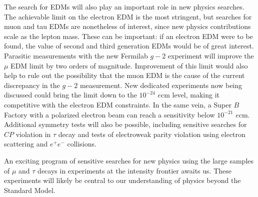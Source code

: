 The search for EDMs will also play an important role in new physics
searches. The achievable limit on the electron EDM is the most stringent, but searches for muon and tau EDMs are nonetheless of interest, since new physics contributions scale as the lepton mass. These can be
important: if an electron EDM were to be found, the value of second and third generation EDMs would be of great interest.  Parasitic measurements with the new Fermilab $g\!\!-\!\!2$ experiment will improve the $\mu$ EDM limit by two
orders of magnitude. Improvement of this limit would also help to rule out
the possibility that the muon EDM is the cause of the current discrepancy in the
$g\!\!-\!\!2$ measurement. New dedicated experiments now being discussed
could bring the limit down to the $10^{-24}$ $e$cm level, making it
competitive with the electron EDM constraints. In the same vein, a Super $B$ Factory with a polarized electron beam can reach a sensitivity below $10^{-21}$ $e$cm.
Additional symmetry tests will also be possible, including sensitive searches for $C\!P$ violation in $\tau$ decay and 
tests of electroweak parity violation using electron scattering and $e^+e^-$ collisions. 

An exciting program of sensitive searches for new physics using the large samples of $\mu$ and $\tau$ decays in experiments at the intensity frontier awaits us. These experiments will likely be central to our understanding of physics beyond the Standard Model.



